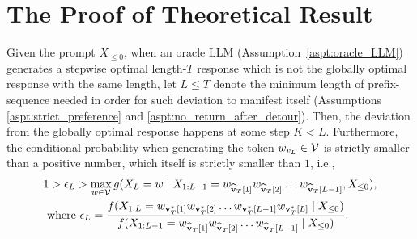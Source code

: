 \section{The Proof of Theoretical Result}

\begin{theorem}\label{supp:thm:small_conditional_prob}
    Given the prompt $X_{\leq 0}$, when an oracle LLM (Assumption~\ref{aspt:oracle_LLM}) generates a stepwise optimal length-$T$ response which is not the globally optimal response with the same length, let $L \leq T$ denote the minimum length of prefix-sequence needed in order for such deviation to manifest itself (Assumptions \ref{aspt:strict_preference} and \ref{aspt:no_return_after_detour}).
    Then, the deviation from the globally optimal response happens at some step $K < L$.
    Furthermore, the conditional probability when generating the token $w_{v_L} \in \mathcal{V}$ is strictly smaller than a positive number, which itself is strictly smaller than $1$, i.e.,
    \begin{equation}
        \begin{split}
             & 1 > \epsilon_L > \max_{w \in \mathcal{V}} g(X_L = w \mid X_{1:L-1} = w_{\widehat{\mathbf{v}}_T[1]} w_{\widehat{\mathbf{v}}_T[2]} \ldots w_{\widehat{\mathbf{v}}_T[L - 1]}, X_{\leq 0}),                                                                                                         \\
             & \text{        where } \epsilon_L = \frac{f(X_{1:L} = w_{\mathbf{v}_T^*[1]} w_{\mathbf{v}_T^*[2]} \ldots w_{\mathbf{v}_T^*[L - 1]} w_{\mathbf{v}_T^*[L]} \mid X_{\leq 0})}{f(X_{1:L - 1} = w_{\widehat{\mathbf{v}}_T[1]} w_{\widehat{\mathbf{v}}_T[2]} \ldots w_{\widehat{\mathbf{v}}_T[L - 1]} \mid X_{\leq 0})}.
        \end{split}
    \end{equation}
\end{theorem}

